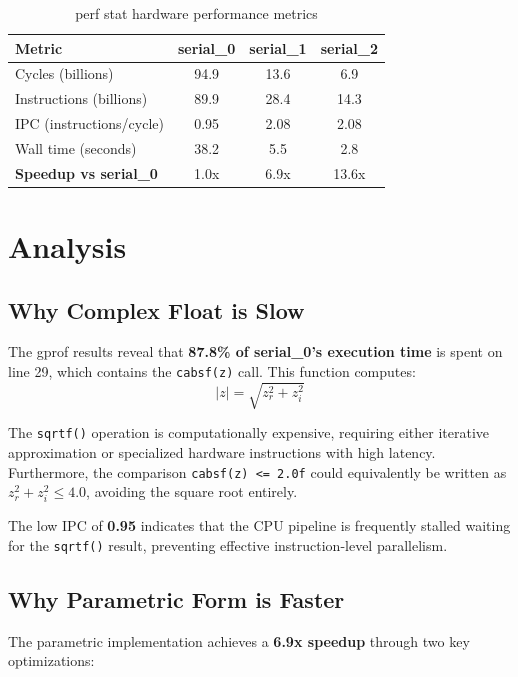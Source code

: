 \documentclass[11pt]{article}
\begin{document}
\begin{table}[h]
\centering
\caption{perf stat hardware performance metrics}
\label{tab:perf}
\begin{tabular}{@{}lSSS@{}}
\toprule
\textbf{Metric} & \textbf{serial\_0} & \textbf{serial\_1} & \textbf{serial\_2} \\
\midrule
Cycles (billions) & 94.9 & 13.6 & 6.9 \\
Instructions (billions) & 89.9 & 28.4 & 14.3 \\
IPC (instructions/cycle) & 0.95 & 2.08 & 2.08 \\
Wall time (seconds) & 38.2 & 5.5 & 2.8 \\
\midrule
\textbf{Speedup vs serial\_0} & {1.0x} & {6.9x} & {13.6x} \\
\bottomrule
\end{tabular}
\end{table}

\section{Analysis}

\subsection{Why Complex Float is Slow}

The gprof results reveal that \textbf{87.8\% of serial\_0's execution time} is spent on line 29, which contains the \texttt{cabsf(z)} call. This function computes:
\[
|z| = \sqrt{z_r^2 + z_i^2}
\]

The \texttt{sqrtf()} operation is computationally expensive, requiring either iterative approximation or specialized hardware instructions with high latency. Furthermore, the comparison \texttt{cabsf(z) <= 2.0f} could equivalently be written as $z_r^2 + z_i^2 \leq 4.0$, avoiding the square root entirely.

The low IPC of \textbf{0.95} indicates that the CPU pipeline is frequently stalled waiting for the \texttt{sqrtf()} result, preventing effective instruction-level parallelism.

\subsection{Why Parametric Form is Faster}

The parametric implementation achieves a \textbf{6.9x speedup} through two key optimizations:
\end{document}
